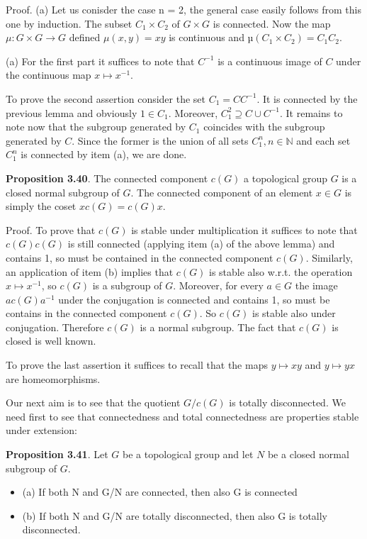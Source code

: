 \documentclass[12pt]{article}
\begin{document}
        Proof. (a) Let us conisder the case n = 2, the general case easily follows from this one by induction. The
    subset $C_1 \times C_2$ of $G \times G$ is connected. Now the map $\mu : G \times G \to G$ defined $\mu(x, y) = xy$ is continuous and
    $µ(C_1 \times C_2) = C_1 C_2$.


    (a) For the first part it suffices to note that $C^{-1}$ is a continuous image of $C$ under the continuous map
    $x \mapsto x^{-1}$.


        To prove the second assertion consider the set $C_1 = CC^{-1}$. It is connected by the previous lemma and
    obviously $1 \in C_1$. Moreover, $C^2_1 \supseteq C \cup C^{-1}$. It remains to note now that the subgroup generated by $C_1$
    coincides with the subgroup generated by $C$. Since the former is the union of all sets $C^n_1, n \in \mathbb{N}$ and each set
    $C^n_1$ is connected by item (a), we are done.


    \textbf{Proposition 3.40}. The connected component $c(G)$ a topological group $G$ is a closed normal subgroup of $G$.
    The connected component of an element $x \in G$ is simply the coset $xc(G) = c(G)x$.
    
    
    Proof. To prove that $c(G)$ is stable under multiplication it suffices to note that $c(G)c(G)$ is still connected
    (applying item (a) of the above lemma) and contains 1, so must be contained in the connected component $c(G)$.
    Similarly, an application of item (b) implies that $c(G)$ is stable also w.r.t. the operation $x \mapsto x^{-1}$, so $c(G)$ is a
    subgroup of $G$. Moreover, for every $a \in G$ the image $ac(G)a^{-1}$ under the conjugation is connected and contains
    1, so must be contains in the connected component $c(G)$. So $c(G)$ is stable also under conjugation. Therefore
    $c(G)$ is a normal subgroup. The fact that $c(G)$ is closed is well known.
    
    
    To prove the last assertion it suffices to recall that the maps $y \mapsto xy$ and $y \mapsto yx$ are homeomorphisms.
    
    
    Our next aim is to see that the quotient $G/c(G)$ is totally disconnected. We need first to see that connectedness and total
    connectedness are properties stable under extension:


    \textbf{Proposition 3.41}. Let $G$ be a topological group and let $N$ be a closed normal subgroup of $G$.
    \begin{itemize}

        \item (a) If both N and G/N are connected, then also G is connected

        \item (b) If both N and G/N are totally disconnected, then also G is totally disconnected.
    
    \end{itemize}
\end{document}
